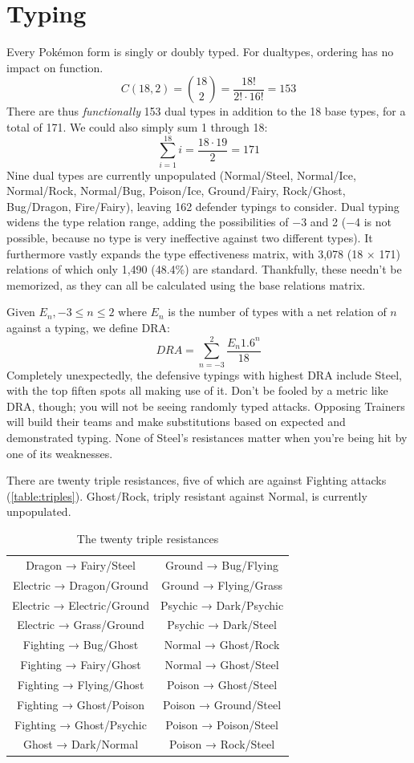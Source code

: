 \section{Typing\label{sec:dualtypes}}
Every Pokémon form is singly or doubly typed.
For dualtypes, ordering has no impact on function.
\[ C(18, 2) = \binom{18}{2} = \frac{18!}{2! \cdot 16!} = 153 \]
There are thus \textit{functionally} 153 dual types in addition to the 18 base types, for a total of 171.
We could also simply sum 1 through 18:
\[ \sum_{i=1}^{18} i = \frac{18 \cdot 19}{2} = 171 \]
Nine dual types are currently unpopulated (Normal/Steel, Normal/Ice, Normal/Rock,
 Normal/Bug, Poison/Ice, Ground/Fairy, Rock/Ghost, Bug/Dragon, Fire/Fairy),
 leaving 162 defender typings to consider.
Dual typing widens the type relation range, adding the possibilities
 of −3 and 2 (−4 is not possible, because no type is very ineffective against
 two different types).
It furthermore vastly expands the type effectiveness matrix,
 with 3,078 (18 × 171) relations of which only 1,490 (48.4\%) are standard.
Thankfully, these needn't be memorized, as they can all be calculated
 using the base relations matrix.

Given $E_{n}, −3 \le n \le 2$ where $E_n$ is the number of types with
  a net relation of $n$ against a typing, we define DRA\@:
\[  DRA = \sum_{n=−3}^{2} \frac{E_{n}1.6^n}{18} \]
Completely unexpectedly, the defensive typings with highest DRA include Steel,
  with the top fiften spots all making use of it.
Don't be fooled by a metric like DRA, though; you will not be seeing
  randomly typed attacks.
Opposing Trainers will build their teams and make substitutions based on
  expected and demonstrated typing.
None of Steel's resistances matter when you're being hit by one of its
  weaknesses.

There are twenty triple resistances, five of which are against Fighting attacks (\autoref{table:triples}).
Ghost/Rock, triply resistant against Normal, is currently unpopulated.
\begin{table}
\centering
\begin{tabular}{cc}
Dragon → Fairy/Steel & Ground → Bug/Flying \\
Electric → Dragon/Ground & Ground → Flying/Grass \\
Electric → Electric/Ground & Psychic → Dark/Psychic \\
Electric → Grass/Ground & Psychic → Dark/Steel \\
Fighting → Bug/Ghost & Normal → Ghost/Rock \\
Fighting → Fairy/Ghost & Normal → Ghost/Steel \\
Fighting → Flying/Ghost & Poison → Ghost/Steel \\
Fighting → Ghost/Poison & Poison → Ground/Steel \\
Fighting → Ghost/Psychic & Poison → Poison/Steel \\
Ghost → Dark/Normal & Poison → Rock/Steel \\
\end{tabular}
\caption{The twenty triple resistances\label{table:triples}}
\end{table}

